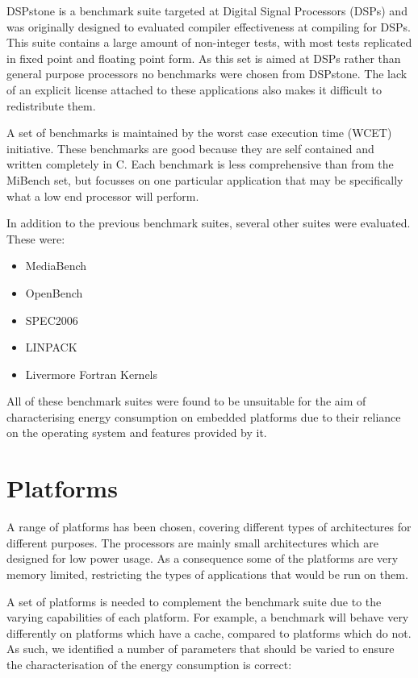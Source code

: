 \documentclass[twocolumn]{article}
\newcommand{\nsection}[1]{\section{\bfseries #1}}
\begin{document}
DSPstone\cite{Zivojnovic} is a benchmark suite targeted at Digital Signal Processors (DSPs) and was originally designed to evaluated compiler effectiveness at compiling for DSPs. This suite contains a large amount of non-integer tests, with most tests replicated in fixed point and floating point form. As this set is aimed at DSPs rather than general purpose processors no benchmarks were chosen from DSPstone. The lack of an explicit license attached to these applications also makes it difficult to redistribute them.

A set of benchmarks is maintained by the worst case execution time (WCET) initiative\cite{Gustafsson2010}. These benchmarks are good because they are self contained and written completely in C. Each benchmark is less comprehensive than from the MiBench set, but focusses on one particular application that may be specifically what a low end processor will perform.

In addition to the previous benchmark suites, several other suites were evaluated. These were:
\begin{itemize}
	\setlength{\itemsep}{-0.25em}
	\item MediaBench
	\item OpenBench\cite{OpenBench}
	\item SPEC2006\cite{Henning2006}
	\item LINPACK
	\item Livermore Fortran Kernels
\end{itemize}

All of these benchmark suites were found to be unsuitable for the aim of characterising energy consumption on embedded platforms due to their reliance on the operating system and features provided by it.

\nsection{Platforms}

A range of platforms has been chosen, covering different types of architectures for different purposes. The processors are mainly small architectures which are designed for low power usage. As a consequence some of the platforms are very memory limited, restricting the types of applications that would be run on them.

A set of platforms is needed to complement the benchmark suite due to the varying capabilities of each platform. For example, a benchmark will behave very differently on platforms which have a cache, compared to platforms which do not. As such, we identified a number of parameters that should be varied to ensure the characterisation of the energy consumption is correct:
\end{document}
